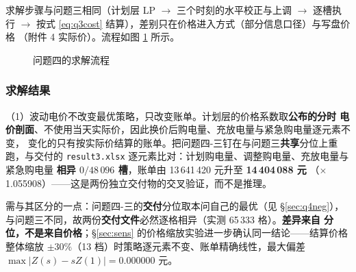 \documentclass[withoutpreface]{cumcmthesis}
\renewcommand{\emph}[1]{\textbf{#1}}
\begin{document}
求解步骤与问题三相同（计划层 LP $\to$ 三个时刻的水平校正与上调 $\to$ 逐槽执行
$\to$ 按式 \eqref{eq:q3cost} 结算），差别只在价格进入方式（部分信息口径）与写盘价格
（附件 4 实际价）。流程如图 \ref{fig:q4flow} 所示。

\begin{figure}[!htbp]
  \centering
  \caption{问题四的求解流程}
  \label{fig:q4flow}
\end{figure}

\subsubsection{求解结果}
\label{sec:q4result}

\noindent（1）波动电价不改变最优策略，只改变账单。计划层的价格系数取\emph{公布的分时
电价剖面}、不使用当天实际价，因此换价后购电量、充放电量与紧急购电量逐元素不变，
变化的只有按实际价结算的账单。把问题四-三钉在与问题三\emph{共享}分位上重跑，与交付的
\texttt{result3.xlsx} 逐元素比对：计划购电量、调整购电量、充放电量与紧急购电量
\textbf{相异 $0/48\,096$ 槽}，账单由 13\,641\,420 元升至 \textbf{14\,404\,088 元}
（$\times$1.055908）——这是两份独立交付物的交叉验证，而不是推理。

\noindent 需与其区分的一点：问题四-三的\emph{交付}分位取本问自己的最优（见 \S\ref{sec:q4neg}），
与问题三不同，故两份\emph{交付文件}必然逐格相异（实测 65\,333 格）。\textbf{差异来自
分位，不是来自价格}；\S\ref{sec:sens} 的价格缩放实验进一步确认同一结论——结算价格
整体缩放 $\pm30\%$（13 档）时策略逐元素不变、账单精确线性，最大偏差
$\max|Z(s)-sZ(1)|=0.000000$ 元。
\end{document}
